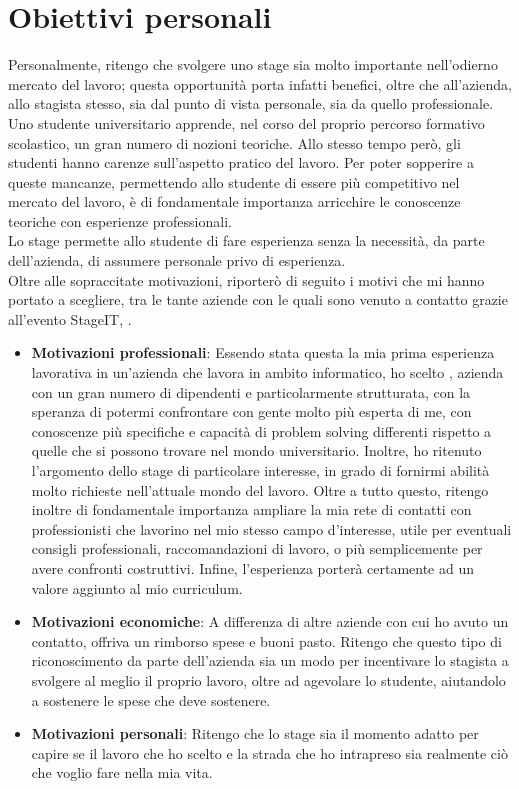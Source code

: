 \section{Obiettivi personali}
Personalmente, ritengo che svolgere uno stage sia molto importante nell'odierno mercato del lavoro; questa opportunità porta infatti benefici, oltre che all'azienda, allo stagista stesso, sia dal punto di vista personale, sia da quello professionale. \\
Uno studente universitario apprende, nel corso del proprio percorso formativo scolastico, un gran numero di nozioni teoriche. Allo stesso tempo però, gli studenti hanno carenze sull'aspetto pratico del lavoro. Per poter sopperire a queste mancanze, permettendo allo studente di essere più competitivo nel mercato del lavoro, è di fondamentale importanza arricchire le conoscenze teoriche con esperienze professionali. \\
Lo stage permette allo studente di fare esperienza senza la necessità, da parte dell'azienda, di assumere personale privo di esperienza. \\
Oltre alle sopraccitate motivazioni, riporterò di seguito i motivi che mi hanno portato a scegliere, tra le tante aziende con le quali sono venuto a contatto grazie all'evento StageIT, \nomeAzienda.

\begin{itemize}
	\item {\textbf{Motivazioni professionali}: Essendo stata questa la mia prima esperienza lavorativa in un'azienda che lavora in ambito informatico, ho scelto \nomeAzienda, azienda con un gran numero di dipendenti e particolarmente strutturata, con la speranza di potermi confrontare con gente molto più esperta di me, con conoscenze più specifiche e capacità di problem solving differenti rispetto a quelle che si possono trovare nel mondo universitario. Inoltre, ho ritenuto l'argomento dello stage di particolare interesse, in grado di fornirmi abilità molto richieste nell'attuale mondo del lavoro. Oltre a tutto questo, ritengo inoltre di fondamentale importanza ampliare la mia rete di contatti con professionisti che lavorino nel mio stesso campo d'interesse, utile per eventuali consigli professionali, raccomandazioni di lavoro, o più semplicemente per avere confronti costruttivi. Infine, l'esperienza porterà certamente ad un valore aggiunto al mio curriculum.}
	
	\item {\textbf{Motivazioni economiche}: A differenza di altre aziende con cui ho avuto un contatto, \nomeAzienda offriva un rimborso spese e buoni pasto. Ritengo che questo tipo di riconoscimento da parte dell'azienda sia un modo per incentivare lo stagista a svolgere al meglio il proprio lavoro, oltre ad agevolare lo studente, aiutandolo a sostenere le spese che deve sostenere.}
	
	\item {\textbf{Motivazioni personali}: Ritengo che lo stage sia il momento adatto per capire se il lavoro che ho scelto e la strada che ho intrapreso sia realmente ciò che voglio fare nella mia vita.}
	
\end{itemize}